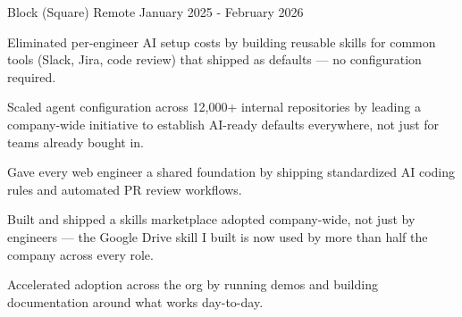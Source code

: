 

\begin{cventries}

    {Block (Square)} %
    {Remote} %
    {January 2025 - February 2026} %
    {
      \begin{cvitems}
        \item {Eliminated per-engineer AI setup costs by building reusable skills for common tools (Slack, Jira, code review) that shipped as defaults — no configuration required.}
        \item {Scaled agent configuration across 12,000+ internal repositories by leading a company-wide initiative to establish AI-ready defaults everywhere, not just for teams already bought in.}
        \item {Gave every web engineer a shared foundation by shipping standardized AI coding rules and automated PR review workflows.}
        \item {Built and shipped a skills marketplace adopted company-wide, not just by engineers — the Google Drive skill I built is now used by more than half the company across every role.}
        \item {Accelerated adoption across the org by running demos and building documentation around what works day-to-day.}
      \end{cvitems}
    }


\end{cventries}
